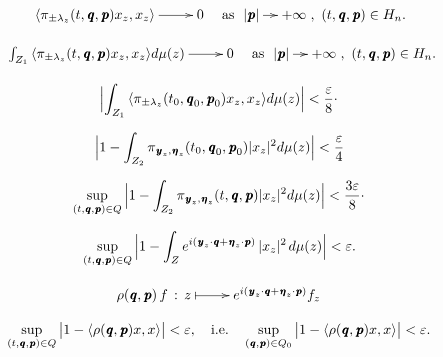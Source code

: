 \documentclass[11pt,english,a4paper]{article}
\begin{document}
\[
\xymatrix{
{\ensuremath{{\langle {\pi _{\pm\lambda_{z} }(t,{\mkern 1.5 mu\pmb{q}},{\mkern 1.5 mu\pmb{p}})x_{z}},{x_{z}}\rangle}}}\ar[r]&0
}\quad\textrm{as}\ \xymatrix@C=10pt{|{\mkern 1.5 mu\pmb{p}}|\ar[r]&+\infty },\ (t,{\mkern 1.5 mu\pmb{q}},{\mkern 1.5 mu\pmb{p}})\in H_{n}.
\]

\[
\xymatrix{{\displaystyle}\int_{Z_{1}}
{\ensuremath{{\langle {\pi _{\pm\lambda_{z} }(t,{\mkern 1.5 mu\pmb{q}},{\mkern 1.5 mu\pmb{p}})x_{z}},{x_{z}}\rangle}}}d\mu (z)\ar[r]&0
}\quad\textrm{as}\ \xymatrix@C=10pt{|{\mkern 1.5 mu\pmb{p}}|\ar[r]&+\infty },\ (t,{\mkern 1.5 mu\pmb{q}},{\mkern 1.5 mu\pmb{p}})\in H_{n}.
\]

\[
\Bigl|\int_{Z_{1}}
{\ensuremath{{\langle {\pi _{\pm\lambda_{z} }(t_{0},{\mkern 1.5 mu\pmb{q}}_{0},{\mkern 1.5 mu\pmb{p}}_{0})x_{z}},{x_{z}}\rangle}}}d\mu (z)\Bigr|<\dfrac{\varepsilon }{8}\cdot 
\]

\[
\Bigl|1-\int_{Z_{2}}\pi _{{\mkern 1.5 mu\pmb{y}}_{z},{\mkern 1.5 mu\pmb{\eta}} _{z}}(t_{0},{\mkern 1.5 mu\pmb{q}}_{0},{\mkern 1.5 mu\pmb{p}}_{0})|x_{z}|^{2}d\mu (z)\Bigr|<\dfrac{\varepsilon }{4}
\]

\[
\sup_{(t,{\mkern 1.5 mu\pmb{q}},{\mkern 1.5 mu\pmb{p}})\in{Q}}\,\Bigl|1-\int_{Z_{2}}\pi _{{\mkern 1.5 mu\pmb{y}}_{z},{\mkern 1.5 mu\pmb{\eta}} _{z}}(t,{\mkern 1.5 mu\pmb{q}},{\mkern 1.5 mu\pmb{p}})|x_{z}|^{2}d\mu (z)\Bigr|<\dfrac{3\varepsilon }{8}\cdot 
\]

\begin{equation}\label{Eq18}
 \sup_{(t,{\mkern 1.5 mu\pmb{q}},{\mkern 1.5 mu\pmb{p}})\in{Q}}\,\Bigl|1-\int_{Z}e^{i({\mkern 1.5 mu\pmb{y}}_{z}\cdot{\mkern 1.5 mu\pmb{q}}+{\mkern 1.5 mu\pmb{\eta}} _{z}\cdot{\mkern 1.5 mu\pmb{p}})}\,|x_{z}|^{2\,}d\mu (z)\Bigr|<\varepsilon . 
\end{equation}

\[
\xymatrix{
\rho ({\mkern 1.5 mu\pmb{q}},{\mkern 1.5 mu\pmb{p}})\,f\,:\,z\ar@{|->}[r]&e^{i({\mkern 1.5 mu\pmb{y}}_{z}\cdot{\mkern 1.5 mu\pmb{q}}+{\mkern 1.5 mu\pmb{\eta}} _{z}\cdot{\mkern 1.5 mu\pmb{p}})}f_z
}
\]

\begin{align*}
 \sup_{(t,{\mkern 1.5 mu\pmb{q}},{\mkern 1.5 mu\pmb{p}})\in{Q}}\,\bigl|1-{\ensuremath{{\langle {\rho ({\mkern 1.5 mu\pmb{q}},{\mkern 1.5 mu\pmb{p}})x},{x}\rangle}}}\bigr|<\varepsilon,\quad\textrm{i.e.}\quad
\sup_{({\mkern 1.5 mu\pmb{q}},{\mkern 1.5 mu\pmb{p}})\in{Q}_{0}}\,\bigl|1-{\ensuremath{{\langle {\rho ({\mkern 1.5 mu\pmb{q}},{\mkern 1.5 mu\pmb{p}})x},{x}\rangle}}}\bigr|<\varepsilon.
\end{align*}
\end{document}
